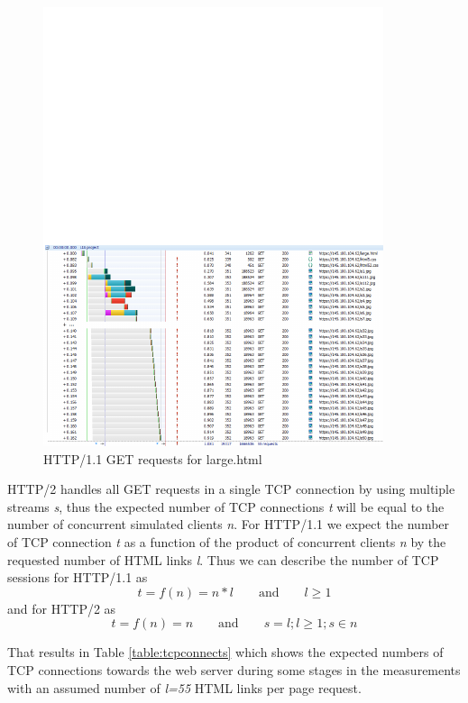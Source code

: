 \begin{figure}[H]
	\centering
	\includegraphics[scale=2,trim=0.0cm .0cm .0cm 4.5cm,clip]{images/http.pdf}
	\caption{HTTP/1.1 GET requests for large.html}
	\label{fig:httpwatch}
\end{figure}

HTTP/2 handles all GET requests in a single TCP connection by using multiple streams \textit{s}, thus the expected number of TCP connections \textit{t} will be equal to the number of concurrent simulated clients \textit{n}. For HTTP/1.1  we expect the number of TCP connection \textit{t} as a function of the product of concurrent clients \textit{n} by the requested number of HTML links \textit{l}. Thus we can describe the number of TCP sessions for HTTP/1.1 as \begin{equation}
t=f(n)=n*l \qquad \text{and} \qquad l \geq 1\end{equation} and for HTTP/2 as \begin{equation} t=f(n)=n \qquad \text{and} \qquad s=l; l\geq 1; s \in n \end{equation}

That results in Table \ref{table:tcpconnects} which shows the expected numbers of TCP connections towards the web server during some stages in the measurements with an assumed number of \textit{l=55} HTML links per page request.

